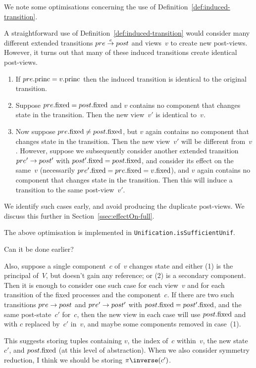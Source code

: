 We note some optimisations concerning the use of
Definition~\ref{def:induced-transition}.  
%
\begin{opt}
\label{opt:avoid-induced}
A straightforward use of Definition~\ref{def:induced-transition} would
consider many different extended transitions $pre \stackrel{e}\rightarrow post$ and
views~$v$ to create new post-views.  However, it turns out that many of these
induced transitions create identical post-views.
%
\begin{enumerate}
\item\label{case:avoid-induced-1} If $pre.\mathrm{princ} = v.\mathrm{princ}$ then the induced
  transition is identical to the original transition. 

\item\label{case:avoid-induced-2} Suppose $pre.\mathrm{fixed} = post.\mathrm{fixed}$ and $v$
  contains no component that changes state in the transition.  Then the new
  view~$v'$ is identical to~$v$.

\item\label{case:avoid-induced-3} Now suppose $pre.\mathrm{fixed} \ne post.\mathrm{fixed}$,
  but $v$ again contains no component that changes state in the transition.
  Then the new view~$v'$ will be different from~$v$.  However, suppose we
  subsequently consider another extended transition $pre' \stackrel{}\rightarrow post'$ with
  $post'.\mathrm{fixed} = post.\mathrm{fixed}$, and consider its effect on the same~$v$
  (necessarily $pre'.\mathrm{fixed} = pre.\mathrm{fixed} = v.\mathrm{fixed}$), and $v$ again contains
  no component that changes state in the transition.  Then this will induce a
  transition to the same post-view~$v'$.
\end{enumerate}
%
We identify such cases early, and avoid producing the duplicate post-views.
We discuss this further in Section~\ref{ssec:effectOn-full}. 
\end{opt}

\begin{impNote}
The above optimisation is implemented in
\texttt{Unification.isSufficientUnif}.  
\end{impNote}

\begin{improve}
Can it be done earlier?  

Also, suppose a single component~$c$ of~$v$ changes state and either (1) is
the principal of~$V$, but doesn't gain any reference; or (2) is a secondary
component.  Then it is enough to consider one such case for each view~$v$ and
for each transition of the fixed processes and the component~$c$.  If there
are two such transitions $pre \stackrel{}\rightarrow post$ and $pre' \stackrel{}\rightarrow post'$ with
$post.\mathrm{fixed} = post'.\mathrm{fixed}$, and the same post-state~$c'$ for~$c$, then the
new view in each case will use $post.\mathrm{fixed}$ and with $c$ replaced by~$c'$
in~$v$, and maybe some components removed in case~(1).

This suggests storing tuples containing $v$, the index of~$c$ within~$v$, the
new state~$c'$, and $post.\mathrm{fixed}$ (at this level of abstraction).  When we
also consider symmetry reduction, I think we should be storing
$\pi\inverse(c')$. 

\end{improve}


